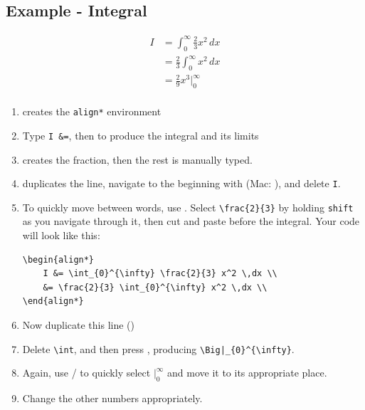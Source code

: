 \subsection{Example - Integral}
\begin{align*}
    I &= \int_{0}^{\infty} \frac{2}{3} x^2 \,dx \\
    &= \frac{2}{3} \int_{0}^{\infty} x^2 \,dx \\
    &= \frac{2}{9} x^3 \Big|_{0}^{\infty} \\
\end{align*}
\begin{enumerate}
    \item {} creates the \texttt{align*} environment
    \item Type \verb|I &=|, then  to produce the integral and its limits
    \item {} creates the fraction, then the rest is manually typed.
    \item \keys{\Alt + \shift + \arrowkeydown} duplicates the line, navigate to the beginning with \keys{\ctrl + \arrowkeyleft} (Mac: \keys{\cmd + \arrowkeyleft}), and delete \verb|I|. 
    \item To quickly move between words, use \keys{\Alt + \arrowkeyright} \keys{\arrowkeyleft}. Select \verb|\frac{2}{3}| by holding \texttt{shift} as you navigate through it, then cut and paste before the integral. Your code will look like this:
    \begin{lstlisting}
\begin{align*}
    I &= \int_{0}^{\infty} \frac{2}{3} x^2 \,dx \\
    &= \frac{2}{3} \int_{0}^{\infty} x^2 \,dx \\
\end{align*}        
    \end{lstlisting}
    \item Now duplicate this line (\keys{\Alt + \shift + \arrowkeydown})
    \item Delete \verb|\int|, and then press , producing \verb!\Big|_{0}^{\infty}!.
    \item Again, use \keys{\Alt + \shift + \arrowkeyleft}/\keys{\arrowkeyright} to quickly select \( \Big|_{0}^{\infty} \) and move it to its appropriate place.
    \item Change the other numbers appropriately.
\end{enumerate}